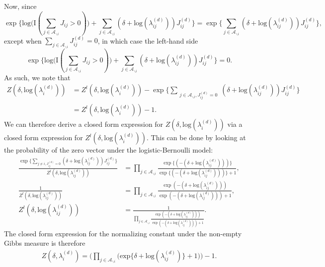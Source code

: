\documentclass[a4paper]{article}
\begin{document}
  	 Now, since 
  	\begin{equation*}
  	\exp\Big\{ \mbox{log}\big(\text{I}( \sum_{j \in \mathcal{A}_{\backslash i}} J_{ij} > 0 )\big) + \sum_{j \in \mathcal{A}_{\backslash i}} (\delta+\mbox{log}(\lambda_{ij}^{(d)}))J_{ij}^{(d)} \Big\}= \exp\Big\{ \sum_{j \in \mathcal{A}_{\backslash i}} (\delta+\mbox{log}(\lambda_{ij}^{(d)}))J_{ij}^{(d)} \Big\},
  	\end{equation*} except when $\sum\limits_{j \in \mathcal{A}_{\backslash i}} J^{(d)}_{ij}=0$, in which case the left-hand side 
  	\begin{equation*}
\exp\Big\{ \mbox{log}\big(\text{I}( \sum_{j \in \mathcal{A}_{\backslash i}} J_{ij} > 0 )\big) + \sum_{j \in \mathcal{A}_{\backslash i}} (\delta+\mbox{log}(\lambda_{ij}^{(d)}))J_{ij}^{(d)} \Big\}= 0.  	
\end{equation*}
 As such, we note that 
 \begin{equation*}
 \begin{aligned}
Z(\delta,\mbox{log}(\lambda_{i}^{(d)}))& = Z^{l}(\delta,\mbox{log}(\lambda_{i}^{(d)})) -  \exp\Big\{ \sum\limits_{\substack{j \in \mathcal{A}_{\backslash i}, J^{(d)}_{ij}=0}} (\delta+\mbox{log}(\lambda_{ij}^{(d)}))J_{ij}^{(d)} \Big\}
\\& = Z^{l}(\delta,\mbox{log}(\lambda_{i}^{(d)})) -  1.
\end{aligned}
 \end{equation*}
   We can therefore derive a closed form expression for $Z(\delta,\mbox{log}(\lambda_{i}^{(d)}))$ via a closed form expression for $Z^{l}(\delta,\mbox{log}(\lambda_{i}^{(d)}))$. This can be done by looking at the probability of the zero vector under the logistic-Bernoulli model:
   \begin{equation*}
   \begin{aligned}
\frac{\exp\Big\{\sum_{j\neq i, J^{(d)}_{ij}=0} (\delta+\mbox{log}(\lambda_{ij}^{(d)}))J_{ij}^{(d)} \Big\}}{Z^{l}(\delta,\mbox{log}(\lambda_{ij}^{(d)}))} &= \prod_{j \in \mathcal{A}_{\backslash i} }   \frac{ \exp\{(-(\delta+\mbox{log}(\lambda_{ij}^{(d)})))\}}{\exp\{(-(\delta+\mbox{log}(\lambda_{ij}^{(d)})))\} + 1},\\
\frac{1}{Z^{l}(\delta,\mbox{log}(\lambda_{ij}^{(d)}))} &= \prod_{j \in \mathcal{A}_{\backslash i} }   \frac{ \exp{(-(\delta+\mbox{log}(\lambda_{ij}^{(d)})))}}{\exp{(-(\delta+\mbox{log}(\lambda_{ij}^{(d)})))} + 1}, \\
Z^{l}(\delta,\mbox{log}(\lambda_{ij}^{(d)})) &= \frac{1}{\prod_{j \in \mathcal{A}_{\backslash i}}   \frac{ \exp{(-(\delta+\mbox{log}(\lambda_{ij}^{(d)})))}}{\exp{(-(\delta+\mbox{log}(\lambda_{ij}^{(d)})))} + 1}}.
  	 \end{aligned}  
  	 \end{equation*}
  	 The closed form expression for the normalizing constant under the non-empty Gibbs measure is therefore    \begin{equation*}
  	 \begin{aligned}Z(\delta,\lambda_i^{(d)}) = \Big(\prod_{j \in \mathcal{A}_{\backslash i}} \Big(\mbox{exp}\{\delta+\mbox{log}(\lambda_{ij}^{(d)})\} + 1\Big)\Big)-1.
  	  \end{aligned}  
  	  \end{equation*}
\end{document}
